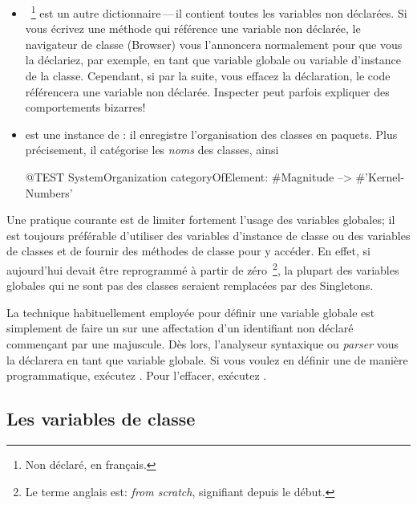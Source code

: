 \documentclass[a4paper,10pt,twoside]{book}
\begin{document}
\begin{itemize}
\item
{}~\footnote{Non d\'eclar\'e, en fran\c{c}ais.} est un autre dictionnaire\,---\,il contient toutes les variables non d\'eclar\'ees.
Si vous \'ecrivez une m\'ethode qui r\'ef\'erence une variable non d\'eclar\'ee,
le navigateur de classe (Browser) vous l'annoncera normalement
pour que vous la d\'eclariez, par exemple, en tant que variable globale ou variable d'instance de la classe.
Cependant, si par la suite, vous effacez la d\'eclaration, le code
r\'ef\'erencera une variable non d\'eclar\'ee. 
Inspecter  peut parfois expliquer des comportements bizarres!

\item
{} est une instance de : il enregistre l'organisation des classes en paquets.  Plus pr\'ecisement, il cat\'egorise les \emph{noms} des classes, ainsi
\begin{code}{@TEST}
SystemOrganization categoryOfElement: #Magnitude --> #'Kernel-Numbers'
\end{code}

\end{itemize}

Une pratique courante est de limiter fortement l'usage des variables globales;
il est toujours pr\'ef\'erable d'utiliser des variables d'instance de classe ou des variables de classes et de fournir des m\'ethodes de classe pour y acc\'eder.
En effet, si aujourd'hui \sq devait \^etre reprogramm\'e \`a partir de
z\'ero~\footnote{Le terme anglais est: \emph{from scratch}, signifiant depuis le d\'ebut.}, la plupart des variables globales qui ne sont pas des classes seraient remplac\'ees par des Singletons.

La technique habituellement employ\'ee pour d\'efinir une variable globale
est simplement de faire un  sur une affectation d'un identifiant
non d\'eclar\'e commen\c{c}ant par une majuscule. D\`es lors,
l'analyseur syntaxique ou \emph{parser} vous 
la d\'eclarera en tant que variable globale.  
Si vous voulez en d\'efinir une de mani\`ere programmatique, ex\'ecutez
.
Pour l'effacer, ex\'ecutez .

\subsection{Les variables de classe}
\label{sec:classVars}
\end{document}

